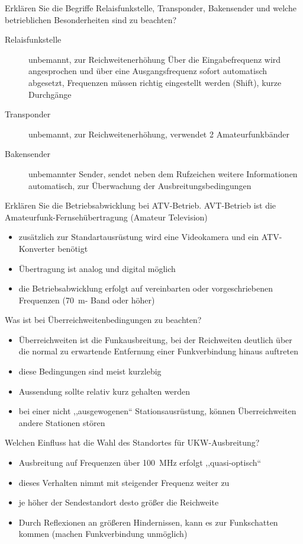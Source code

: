 \documentclass[avery5371,grid,frame,a4paper]{flashcards}
\newcommand{\card}[3]{
  \begin{flashcard}[{\chap} -- #1]{#2}#3\end{flashcard}
}
\begin{document}
\card{63}{Erklären Sie die Begriffe Relaisfunkstelle, Transponder, Bakensender und welche betrieblichen Besonderheiten sind zu beachten?}{
  \small
  \begin{description}
    \item[Relaisfunkstelle] unbemannt, zur Reichweitenerhöhung
      Über die Eingabefrequenz wird angesprochen und über eine Ausgangsfrequenz sofort automatisch abgesetzt, Frequenzen müssen richtig eingestellt werden (Shift), kurze Durchgänge
    \item[Transponder] unbemannt, zur Reichweitenerhöhung, verwendet 2 Amateurfunkbänder
    \item[Bakensender] unbemannter Sender, sendet neben dem Rufzeichen weitere Informationen automatisch, zur Überwachung der Ausbreitungsbedingungen
  \end{description}
}
\card{64}{Erklären Sie die Betriebsabwicklung bei ATV-Betrieb.}{
  AVT-Betrieb ist die Amateurfunk-Fernsehübertragung (Amateur Television)
  \begin{itemize}
    \item zusätzlich zur Standartausrüstung wird eine Videokamera und ein ATV-Konverter benötigt
    \item Übertragung ist analog und digital möglich
    \item die Betriebsabwicklung erfolgt auf vereinbarten oder vorgeschriebenen Frequenzen (\SI{70}{\metre}- Band oder höher)
  \end{itemize}
}
\card{65}{Was ist bei Überreichweitenbedingungen zu beachten?}{
  \small
  \begin{itemize}
    \item Überreichweiten ist die Funkausbreitung, bei der Reichweiten deutlich über die normal zu erwartende Entfernung einer Funkverbindung hinaus auftreten
    \item diese Bedingungen sind meist kurzlebig
    \item Aussendung sollte relativ kurz gehalten werden
    \item bei einer nicht ,,ausgewogenen`` Stationsausrüstung, können Überreichweiten andere Stationen stören
  \end{itemize}
}
\card{66}{Welchen Einfluss hat die Wahl des Standortes für UKW-Ausbreitung?}{
  \begin{itemize}\itemsep0pt
    \item Ausbreitung auf Frequenzen über \SI{100}{\mega\Hz} erfolgt ,,quasi-optisch``
    \item dieses Verhalten nimmt mit steigender Frequenz weiter zu
    \item je höher der Sendestandort desto größer die Reichweite
    \item Durch Reflexionen an größeren Hindernissen, kann es zur Funkschatten kommen (machen Funkverbindung unmöglich)
  \end{itemize}
}
\end{document}

